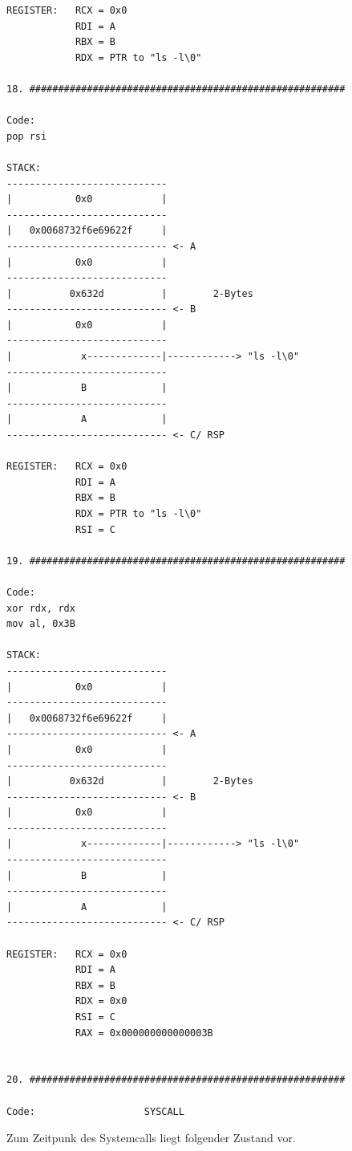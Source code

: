 \documentclass[12pt]{article}
\begin{document}
\begin{lstlisting}
REGISTER:   RCX = 0x0
            RDI = A
            RBX = B
            RDX = PTR to "ls -l\0"

18. #######################################################

Code:
pop rsi

STACK:
----------------------------
|           0x0            |    
----------------------------
|   0x0068732f6e69622f     |
---------------------------- <- A
|           0x0            |
----------------------------
|          0x632d          |        2-Bytes
---------------------------- <- B
|           0x0            |    
----------------------------
|            x-------------|------------> "ls -l\0"
----------------------------
|            B             |
----------------------------
|            A             |
---------------------------- <- C/ RSP

REGISTER:   RCX = 0x0
            RDI = A
            RBX = B
            RDX = PTR to "ls -l\0"
            RSI = C

19. #######################################################

Code:
xor rdx, rdx
mov al, 0x3B

STACK:
----------------------------
|           0x0            |    
----------------------------
|   0x0068732f6e69622f     |
---------------------------- <- A
|           0x0            |
----------------------------
|          0x632d          |        2-Bytes
---------------------------- <- B
|           0x0            |    
----------------------------
|            x-------------|------------> "ls -l\0"
----------------------------
|            B             |
----------------------------
|            A             |
---------------------------- <- C/ RSP

REGISTER:   RCX = 0x0
            RDI = A
            RBX = B
            RDX = 0x0
            RSI = C
            RAX = 0x000000000000003B


20. #######################################################

Code:                   SYSCALL

\end{lstlisting}

\newpage
\begin{center}
    {\Large Zum Zeitpunk des Systemcalls liegt folgender Zustand vor.}
\end{center}
\end{document}
